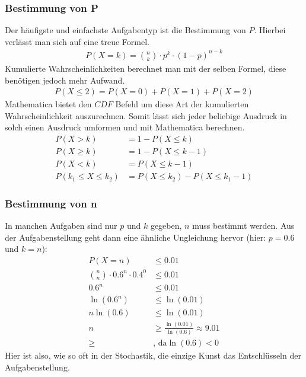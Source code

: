 \subsubsection{Bestimmung von P}
\begin{flushleft}
    Der häufigste und einfachste Aufgabentyp ist die Bestimmung von $P$.
    Hierbei verlässt man sich auf eine treue Formel.
    \begin{align}
        P(X=k)=\binom{n}{k} \cdot p^k \cdot (1-p)^{n-k}
    \end{align}
    Kumulierte Wahrscheinlichkeiten berechnet man mit der selben Formel, diese benötigen
    jedoch mehr Aufwand.
    \begin{align}
        P(X \leq 2)=P(X=0)+P(X=1)+P(X=2)
    \end{align}
    Mathematica bietet den $CDF$ Befehl um diese Art der kumulierten Wahrscheinlichkeit auszurechnen.
    Somit lässt sich jeder beliebige Ausdruck in solch einen Ausdruck umformen und mit Mathematica berechnen.
    \begin{align}
        P(X>k) &= 1-P(X \leq k) \\
        P(X \geq k) &= 1-P(X \leq k-1) \\
        P(X<k) &= P(X \leq k-1) \\
        P(k_{1} \leq X \leq k_{2}) &= P(X \leq k_{2})-P(X \leq k_{1}-1)
    \end{align}
\end{flushleft}

\subsubsection{Bestimmung von n}
\begin{flushleft}
    In manchen Aufgaben sind nur $p$ und $k$ gegeben, $n$ muss bestimmt werden.
    Aus der Aufgabenstellung geht dann eine ähnliche Ungleichung hervor (hier: $p=0.6$ und $k=n$):
    \begin{align}
        P(X=n) &\leq 0.01 \\
        \binom{n}{n} \cdot 0.6^n \cdot 0.4^0 &\leq 0.01 \\
        0.6^n &\leq 0.01 \\
        \ln(0.6^n) &\leq \ln(0.01) \\
        n\ln(0.6) &\leq \ln(0.01) \\
        n &\geq \frac{\ln(0.01)}{\ln(0.6)} \approx 9.01 \\
        \geq &\text{, da} \ln(0.6)<0
    \end{align}
    Hier ist also, wie so oft in der Stochastik, die einzige Kunst das Entschlüsseln der Aufgabenstellung.
\end{flushleft}

